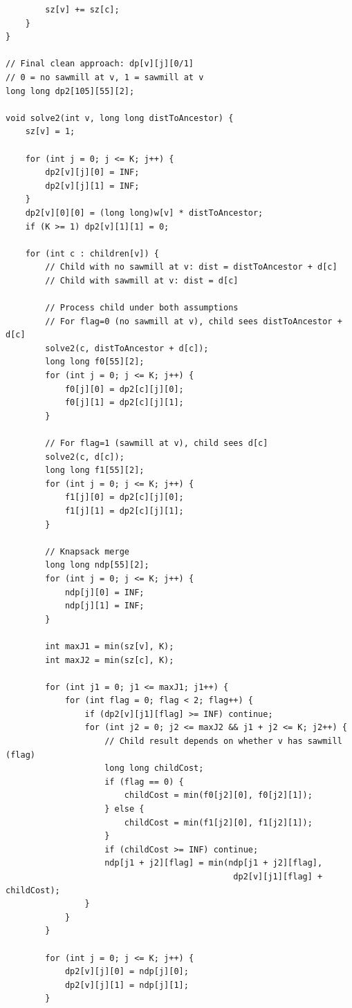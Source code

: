 \documentclass[11pt,a4paper]{article}
\begin{document}
\begin{lstlisting}
        sz[v] += sz[c];
    }
}

// Final clean approach: dp[v][j][0/1]
// 0 = no sawmill at v, 1 = sawmill at v
long long dp2[105][55][2];

void solve2(int v, long long distToAncestor) {
    sz[v] = 1;

    for (int j = 0; j <= K; j++) {
        dp2[v][j][0] = INF;
        dp2[v][j][1] = INF;
    }
    dp2[v][0][0] = (long long)w[v] * distToAncestor;
    if (K >= 1) dp2[v][1][1] = 0;

    for (int c : children[v]) {
        // Child with no sawmill at v: dist = distToAncestor + d[c]
        // Child with sawmill at v: dist = d[c]

        // Process child under both assumptions
        // For flag=0 (no sawmill at v), child sees distToAncestor + d[c]
        solve2(c, distToAncestor + d[c]);
        long long f0[55][2];
        for (int j = 0; j <= K; j++) {
            f0[j][0] = dp2[c][j][0];
            f0[j][1] = dp2[c][j][1];
        }

        // For flag=1 (sawmill at v), child sees d[c]
        solve2(c, d[c]);
        long long f1[55][2];
        for (int j = 0; j <= K; j++) {
            f1[j][0] = dp2[c][j][0];
            f1[j][1] = dp2[c][j][1];
        }

        // Knapsack merge
        long long ndp[55][2];
        for (int j = 0; j <= K; j++) {
            ndp[j][0] = INF;
            ndp[j][1] = INF;
        }

        int maxJ1 = min(sz[v], K);
        int maxJ2 = min(sz[c], K);

        for (int j1 = 0; j1 <= maxJ1; j1++) {
            for (int flag = 0; flag < 2; flag++) {
                if (dp2[v][j1][flag] >= INF) continue;
                for (int j2 = 0; j2 <= maxJ2 && j1 + j2 <= K; j2++) {
                    // Child result depends on whether v has sawmill (flag)
                    long long childCost;
                    if (flag == 0) {
                        childCost = min(f0[j2][0], f0[j2][1]);
                    } else {
                        childCost = min(f1[j2][0], f1[j2][1]);
                    }
                    if (childCost >= INF) continue;
                    ndp[j1 + j2][flag] = min(ndp[j1 + j2][flag],
                                              dp2[v][j1][flag] + childCost);
                }
            }
        }

        for (int j = 0; j <= K; j++) {
            dp2[v][j][0] = ndp[j][0];
            dp2[v][j][1] = ndp[j][1];
        }


\end{lstlisting}
\end{document}
